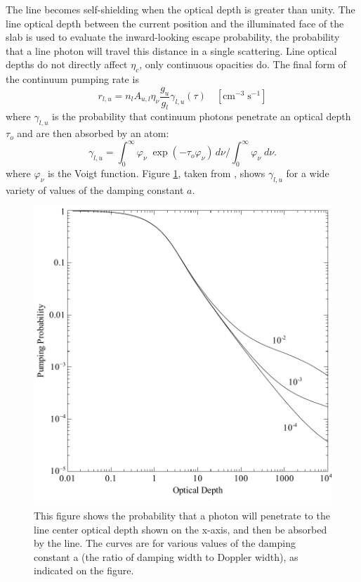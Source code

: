The line becomes self-shielding when the optical depth is greater than
unity.
The line optical depth between the current position and the
illuminated face of the slab is used to evaluate the inward-looking escape
probability, the probability that a line photon will travel this distance
in a single scattering.
Line optical depths do not directly affect $\eta_c$,
only continuous opacities do.
The final form of the continuum pumping rate is
\begin{equation}
{r_{l,u}} = {n_l}{A_{u,l}}{\eta _\nu }\frac{{{g_u}}}{{{g_l}}}{\gamma
_{l,u}}\left( \tau  \right)
\quad [\mathrm{cm}^{-3} \;\mathrm{s}^{-1}]
\end{equation}
where $\gamma_{l,u}$ is the probability that continuum photons
penetrate an optical
depth $\tau_o$ and are then absorbed by an atom:
\begin{equation}
{\gamma _{l,u}} = \int_0^\infty  {{\varphi _\nu }\;\exp \left( { - {\tau
_o}{\varphi _\nu }} \right)\,d\nu } /\int_0^\infty  {{\varphi _\nu }\;d\nu
} .
\end{equation}
where $\varphi_\nu$ is the Voigt function.
Figure \ref{fig:pump_probability},
taken from \citet{Ferland1992}, shows
$\gamma_{l,u}$ for a wide variety of values of the damping constant $a$.

\begin{figure}
\centering
\includegraphics[scale=0.8]{pump_probability}
\caption[Fluorescent pumping probability]{\label{fig:pump_probability}This figure
shows the probability that a photon will penetrate
to the line center optical depth shown on the x-axis, and then be absorbed
by the line.  The curves are for various values of the damping constant
a (the ratio of damping width to Doppler width), as indicated on the
figure.}
\end{figure}

